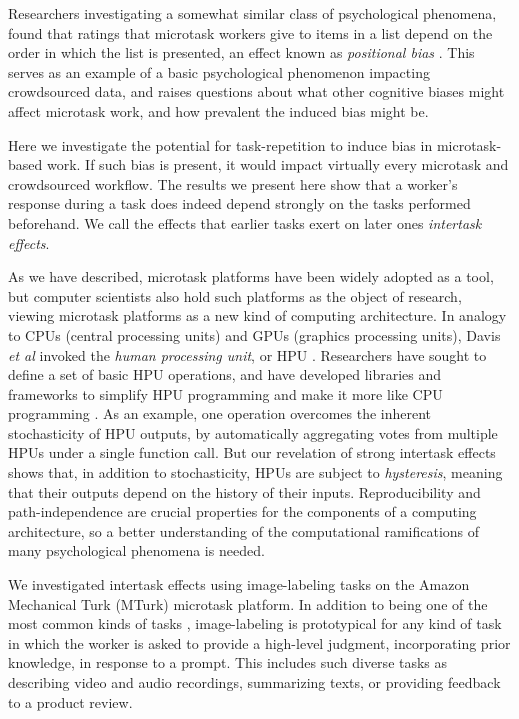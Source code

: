 \documentclass[12pt]{article}
\begin{document}
Researchers investigating a somewhat similar class of psychological phenomena,
found that ratings that microtask workers give to items in a list
depend on the order in which the list is presented, an effect known as
\textit{positional bias} \cite{lerman2014leveraging}.  This serves as an 
example of a basic psychological phenomenon impacting crowdsourced data,
and raises questions about what other cognitive biases might
affect microtask work, and how prevalent the induced bias might be.  

Here we investigate the potential for task-repetition to induce bias in 
microtask-based work.  If such bias is present, it would impact virtually 
every microtask and crowdsourced workflow.
The results we present here show that a worker's response during a task
does indeed depend strongly on the tasks performed beforehand.   
We call the effects that earlier tasks exert on later ones 
\textit{intertask effects}.

As we have described, microtask platforms have been widely adopted as a 
tool, but computer scientists also hold such platforms as the object of 
research, viewing  microtask platforms as a new kind of computing 
architecture.  In analogy to CPUs (central 
processing units) and GPUs (graphics processing units), 
Davis \textit{et al} invoked the \textit{human processing unit}, or HPU \cite{5543192}.
Researchers have sought to define a set of basic HPU operations, and
have developed libraries and frameworks to simplify HPU programming 
and make it more like CPU programming 
\cite{little2010turkit,minder2012crowdlang,kittur2011crowdforge}.  
As an example, one operation overcomes the inherent stochasticity of HPU 
outputs, by automatically aggregating votes from multiple HPUs under a single
function call.  But our revelation of strong intertask effects shows that, 
in addition to stochasticity, HPUs are subject to \textit{hysteresis}, 
meaning that their 
outputs depend on the history of their inputs.  Reproducibility and 
path-independence are crucial properties for the components of a 
computing architecture, so a better understanding of the computational 
ramifications of many psychological phenomena is needed. 

We investigated intertask effects using image-labeling tasks on the Amazon 
Mechanical Turk (MTurk) microtask platform.  
In addition to being one of the most common kinds of tasks
\cite{chandler2013breaking,Berinsky2012351,Finnerty2013,paolacci2010running},
image-labeling is prototypical for any kind of task in which the worker is 
asked to provide a high-level judgment, incorporating prior knowledge, in 
response to a prompt.  
This includes such diverse tasks as describing
video and audio recordings, summarizing texts, or providing feedback to a 
product review.
\end{document}
